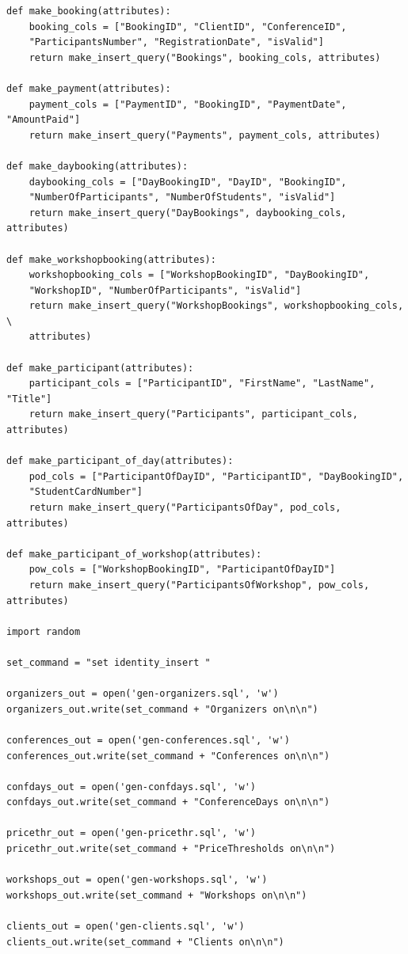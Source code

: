 \documentclass[12pt, a4paper]{mwrep}
\begin{document}
\begin{lstlisting}
def make_booking(attributes):
    booking_cols = ["BookingID", "ClientID", "ConferenceID", 
    "ParticipantsNumber", "RegistrationDate", "isValid"]
    return make_insert_query("Bookings", booking_cols, attributes)

def make_payment(attributes):
    payment_cols = ["PaymentID", "BookingID", "PaymentDate", "AmountPaid"]
    return make_insert_query("Payments", payment_cols, attributes)
    
def make_daybooking(attributes):
    daybooking_cols = ["DayBookingID", "DayID", "BookingID", 
    "NumberOfParticipants", "NumberOfStudents", "isValid"]
    return make_insert_query("DayBookings", daybooking_cols, attributes)

def make_workshopbooking(attributes):
    workshopbooking_cols = ["WorkshopBookingID", "DayBookingID", 
    "WorkshopID", "NumberOfParticipants", "isValid"]
    return make_insert_query("WorkshopBookings", workshopbooking_cols, \
    attributes)

def make_participant(attributes):
    participant_cols = ["ParticipantID", "FirstName", "LastName", "Title"]
    return make_insert_query("Participants", participant_cols, attributes)

def make_participant_of_day(attributes):
    pod_cols = ["ParticipantOfDayID", "ParticipantID", "DayBookingID",
    "StudentCardNumber"]
    return make_insert_query("ParticipantsOfDay", pod_cols, attributes)

def make_participant_of_workshop(attributes):
    pow_cols = ["WorkshopBookingID", "ParticipantOfDayID"]
    return make_insert_query("ParticipantsOfWorkshop", pow_cols, attributes)

import random

set_command = "set identity_insert "

organizers_out = open('gen-organizers.sql', 'w')
organizers_out.write(set_command + "Organizers on\n\n")

conferences_out = open('gen-conferences.sql', 'w')
conferences_out.write(set_command + "Conferences on\n\n")

confdays_out = open('gen-confdays.sql', 'w')
confdays_out.write(set_command + "ConferenceDays on\n\n")

pricethr_out = open('gen-pricethr.sql', 'w')
pricethr_out.write(set_command + "PriceThresholds on\n\n")

workshops_out = open('gen-workshops.sql', 'w')
workshops_out.write(set_command + "Workshops on\n\n")

clients_out = open('gen-clients.sql', 'w')
clients_out.write(set_command + "Clients on\n\n")


\end{lstlisting}
\end{document}
